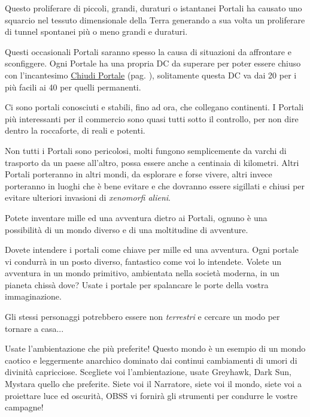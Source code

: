 \begin{multicols}{2}

Questo proliferare di piccoli, grandi, duraturi o istantanei Portali ha causato uno squarcio nel tessuto dimensionale della Terra generando a sua volta un proliferare di tunnel spontanei più o meno grandi e duraturi.

Questi occasionali Portali saranno spesso la causa di situazioni da affrontare e sconfiggere. Ogni Portale ha una propria DC da superare per poter essere chiuso con l'incantesimo \hyperlink{Chiudi Portale}{Chiudi Portale} (pag. \pageref{Chiudi Portale}), solitamente questa DC va dai 20 per i più facili ai 40 per quelli permanenti.

Ci sono portali conosciuti e stabili, fino ad ora, che collegano continenti. I Portali più interessanti per il commercio sono quasi tutti sotto il controllo, per non dire dentro la roccaforte, di reali e potenti.

Non tutti i Portali sono pericolosi, molti fungono semplicemente da varchi di trasporto da un paese all'altro, possa essere anche a centinaia di kilometri. Altri Portali porteranno in altri mondi, da esplorare e forse vivere, altri invece porteranno in luoghi che è bene evitare e che dovranno essere sigillati e chiusi per evitare ulteriori invasioni di \emph{xenomorfi alieni}.

Potete inventare mille ed una avventura dietro ai Portali, ognuno è una possibilità di un mondo diverso e di una moltitudine di avventure.

\begin{narratore}[I Portali]
Dovete intendere i portali come chiave per mille ed una avventura. Ogni portale vi condurrà in un posto diverso, fantastico come voi lo intendete. Volete un avventura in un mondo primitivo, ambientata nella società moderna, in un pianeta chissà dove? Usate i portale per spalancare le porte della vostra immaginazione.

Gli stessi personaggi potrebbero essere non \emph{terrestri} e cercare un modo per tornare a casa...
\end{narratore}

\begin{narratore}[Ambientazione]
Usate l'ambientazione che più preferite! Questo mondo è un esempio di un mondo caotico e leggermente anarchico dominato dai continui cambiamenti di umori di divinità capricciose.
Scegliete voi l'ambientazione, usate Greyhawk, Dark Sun, Mystara quello che preferite. Siete voi il Narratore, siete voi il mondo, siete voi a proiettare luce ed oscurità, OBSS vi fornirà gli strumenti per condurre le vostre campagne!

\end{narratore}

%

\end{multicols}

